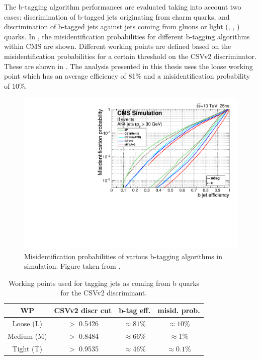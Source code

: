 The b-tagging algorithm performances are evaluated taking into account two cases: discrimination of b-tagged jets originating from charm quarks, and discrimination of b-tagged jets against jets coming from gluons or light (\Pup, \Pdown, \Pstrange) quarks. In , the misidentification probabilities for different b-tagging algorithms within CMS are shown.
Different working points  are defined based on the misidentification probabilities for a certain threshold on the CSVv2 discriminator. These are shown in . The analysis presented in this thesis uses the loose working point which has an average efficiency of 81\% and a misidentification probability of 10\%. 
\begin{figure}[htbp]
	\centering
	\includegraphics[width=0.7\linewidth]{4_EventRecoSelect/Figures/Figure_008}
	\caption{Misidentification probabilities of various b-tagging algorithms in simulation. Figure taken from \cite{CMS-PAS-BTV-15-001}. }
	\label{fig:figure008}
\end{figure}
\begin{table}[htbp]
	\centering
	\caption{Working points used for tagging jets as coming from b quarks for the CSVv2 discriminant.}
	\begin{tabular}{cccc}
		\toprule
		WP  & CSVv2 discr cut & b-tag eff. & misid. prob. \\ 
		\midrule
		Loose (L) & $>$ 0.5426 & $\approx 81\%$ &  $\approx 10\%$ \\ 
	
		Medium (M)& $>$ 0.8484 & $\approx 66\%$ &  $\approx 1\%$\\ 
		
		Tight (T) & $>$ 0.9535 & $\approx 46\%$ &  $\approx 0.1\%$\\ 
		\bottomrule
	\end{tabular} 
	\label{tab:bctag}	
\end{table}
